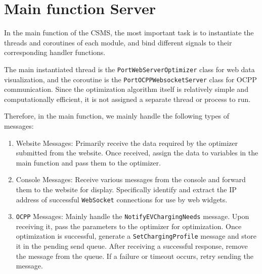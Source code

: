 \documentclass[
english,
ruledheaders=section,%
class=report,%
thesis={type=Report},%
accentcolor=9c,%
custommargins=true,%
marginpar=false,%
parskip=half-,%
fontsize=11pt,%
logofile={img/tuda_logo.pdf}, %
]{tudapub}
\begin{document}
    \section{Main function Server}
    \label{sec:Server}


    In the main function of the CSMS, the most important task is to instantiate the threads and coroutines of each module, and bind different signals to their corresponding handler functions.

    The main instantiated thread is the \texttt{PortWebServerOptimizer} class for web data visualization, and the coroutine is the \texttt{PortOCPPWebsocketServer} class for OCPP communication.
    Since the optimization algorithm itself is relatively simple and computationally efficient, it is not assigned a separate thread or process to run.



    Therefore, in the main function, we mainly handle the following types of messages:

    \begin{enumerate}

        \item Website Messages: Primarily receive the data required by the optimizer submitted from the website. Once received, assign the data to variables in the main function and pass them to the optimizer.

        \item Console Messages: Receive various messages from the console and forward them to the website for display. Specifically identify and extract the IP address of successful \texttt{WebSocket} connections for use by web widgets.

        \item \texttt{OCPP} Messages: Mainly handle the \texttt{NotifyEVChargingNeeds} message. Upon receiving it, pass the parameters to the optimizer for optimization. Once optimization is successful, generate a \texttt{SetChargingProfile} message and store it in the pending send queue. After receiving a successful response, remove the message from the queue. If a failure or timeout occurs, retry sending the message.

    \end{enumerate}
\end{document}
